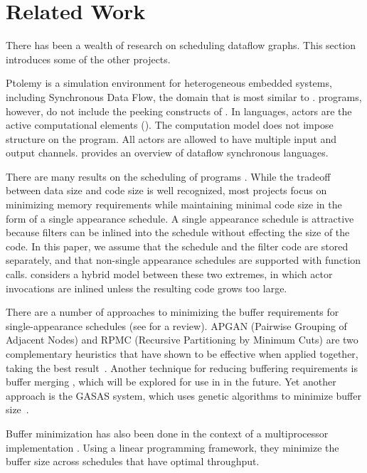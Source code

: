 \section{Related Work}
\label{chpt:related}

There has been a wealth of research on scheduling dataflow graphs.
This section introduces some of the other projects.

Ptolemy \cite{ptolemyoverview} is a simulation environment for
heterogeneous embedded systems, including Synchronous Data Flow, the
domain that is most similar to {\StreamIt}. {\SDF} programs, however,
do not include the peeking constructs of {\StreamIt}.  In {\SDF}
languages, actors are the active computational elements ({\filters}).
The {\SDF} computation model does not impose structure on the program.
All actors are allowed to have multiple input and output channels.
\cite{benveniste93dataflow} provides an overview of dataflow
synchronous languages.

There are many results on the scheduling of {\SDF} programs
\cite{bhattacharyya99synthesis,leesdf}.  While the tradeoff between
data size and code size is well recognized, most projects focus on
minimizing memory requirements while maintaining minimal code size in
the form of a single appearance schedule.  A single appearance
schedule is attractive because filters can be inlined into the
schedule without effecting the size of the code.  In this paper, we
assume that the schedule and the filter code are stored separately,
and that non-single appearance schedules are supported with function
calls. \cite{bhat1999x1} considers a hybrid model between these two
extremes, in which actor invocations are inlined unless the resulting
code grows too large.

There are a number of approaches to minimizing the buffer requirements
for single-appearance schedules (see \cite{bhattacharyya99synthesis}
for a review).  APGAN (Pairwise Grouping of Adjacent Nodes) and RPMC
(Recursive Partitioning by Minimum Cuts) are two complementary
heuristics that have shown to be effective when applied together,
taking the best result~\cite{Bhatta97}.  Another technique for
reducing buffering requirements is buffer merging
\cite{murt1999x3,murt2000x2}, which will be explored for use in {\StreamIt}
in the future.  Yet another approach is the GASAS system, which uses
genetic algorithms to minimize buffer size~\cite{GASAS}.

Buffer minimization has also been done in the context of a
multiprocessor implementation \cite{govindarajan-minimizing}. Using a
linear programming framework, they minimize the buffer size across
schedules that have optimal throughput.

